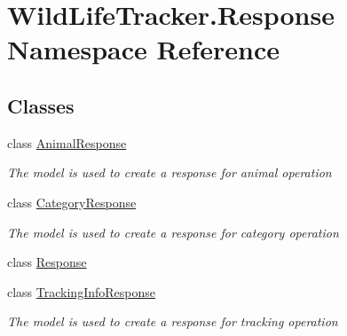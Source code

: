\hypertarget{namespaceWildLifeTracker_1_1Response}{}\section{Wild\+Life\+Tracker.\+Response Namespace Reference}
\label{namespaceWildLifeTracker_1_1Response}
\subsection*{Classes}
\begin{DoxyCompactItemize}
\item 
class \hyperlink{classWildLifeTracker_1_1Response_1_1AnimalResponse}{Animal\+Response}
\begin{DoxyCompactList}\small\item\em The model is used to create a response for animal operation \end{DoxyCompactList}\item 
class \hyperlink{classWildLifeTracker_1_1Response_1_1CategoryResponse}{Category\+Response}
\begin{DoxyCompactList}\small\item\em The model is used to create a response for category operation \end{DoxyCompactList}\item 
class \hyperlink{classWildLifeTracker_1_1Response_1_1Response}{Response}
\item 
class \hyperlink{classWildLifeTracker_1_1Response_1_1TrackingInfoResponse}{Tracking\+Info\+Response}
\begin{DoxyCompactList}\small\item\em The model is used to create a response for tracking operation \end{DoxyCompactList}\end{DoxyCompactItemize}
